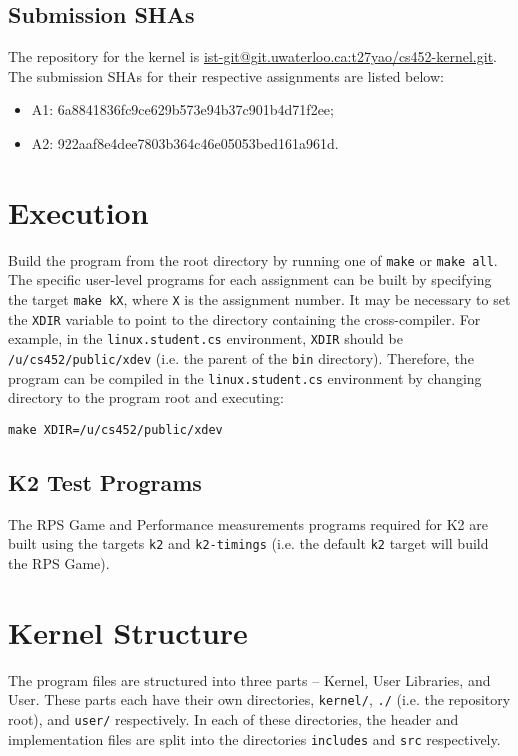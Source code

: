 \documentclass[12pt, titlepage]{article}
\begin{document}
    \subsection{Submission SHAs}

    The repository for the kernel is \href{https://git.uwaterloo.ca/t27yao/cs452-kernel}{ist-git@git.uwaterloo.ca:t27yao/cs452-kernel.git}. The submission SHAs for their respective assignments are listed below:
    \begin{itemize}
        \item A1: 6a8841836fc9ce629b573e94b37c901b4d71f2ee;
        \item A2: 922aaf8e4dee7803b364c46e05053bed161a961d.
    \end{itemize}

    \section{Execution}

    Build the program from the root directory by running one of \verb`make` or \verb`make all`. The specific user-level programs for each assignment can be built by specifying the target \verb`make kX`, where \verb`X` is the assignment number. It may be necessary to set the \verb`XDIR` variable to point to the directory containing the cross-compiler. For example, in the \verb`linux.student.cs` environment, \verb`XDIR` should be \verb`/u/cs452/public/xdev` (i.e. the parent of the \verb`bin` directory). Therefore, the program can be compiled in the \verb`linux.student.cs` environment by changing directory to the program root and executing:
    \begin{verbatim}
make XDIR=/u/cs452/public/xdev
    \end{verbatim}

    \subsection{K2 Test Programs}
    The RPS Game and Performance measurements programs required for K2 are built using the targets \verb`k2` and \verb`k2-timings` (i.e. the default \verb`k2` target will build the RPS Game).

    \section{Kernel Structure}

    The program files are structured into three parts -- Kernel, User Libraries, and User. These parts each have their own directories, \verb`kernel/`, \verb`./` (i.e. the repository root), and \verb`user/` respectively. In each of these directories, the header and implementation files are split into the directories \verb`includes` and \verb`src` respectively.
\end{document}
